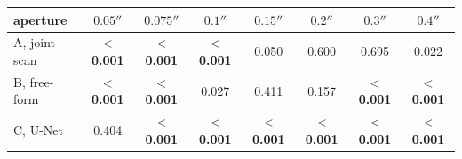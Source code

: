 \begin{tabular}{lccccccc}
\toprule
aperture & $0.05''$ & $0.075''$ & $0.1''$ & $0.15''$ & $0.2''$ & $0.3''$ & $0.4''$ \\
\midrule
A, joint scan & \textbf{$<$0.001} & \textbf{$<$0.001} & \textbf{$<$0.001} & 0.050 & 0.600 & 0.695 & 0.022 \\
B, free-form & \textbf{$<$0.001} & \textbf{$<$0.001} & 0.027 & 0.411 & 0.157 & \textbf{$<$0.001} & \textbf{$<$0.001} \\
C, U-Net & 0.404 & \textbf{$<$0.001} & \textbf{$<$0.001} & \textbf{$<$0.001} & \textbf{$<$0.001} & \textbf{$<$0.001} & \textbf{$<$0.001} \\
\bottomrule
\end{tabular}
